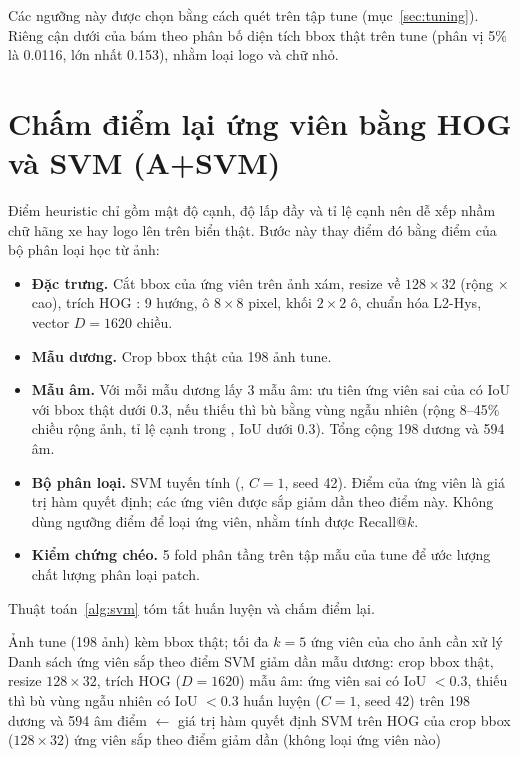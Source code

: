 Các ngưỡng này được chọn bằng cách quét trên tập tune (mục~\ref{sec:tuning}). Riêng cận dưới của  bám theo phân bố diện tích bbox thật trên tune (phân vị 5\% là 0.0116, lớn nhất 0.153), nhằm loại logo và chữ nhỏ.

\section{Chấm điểm lại ứng viên bằng HOG và SVM (A+SVM)}
\label{sec:hogsvm}

Điểm heuristic chỉ gồm mật độ cạnh, độ lấp đầy và tỉ lệ cạnh nên dễ xếp nhầm chữ hãng xe hay logo lên trên biển thật. Bước này thay điểm đó bằng điểm của bộ phân loại học từ ảnh:
\begin{itemize}
  \item \textbf{Đặc trưng.} Cắt bbox của ứng viên trên ảnh xám, resize về $128\times 32$ (rộng $\times$ cao), trích HOG \cite{hog}: 9 hướng, ô $8\times 8$ pixel, khối $2\times 2$ ô, chuẩn hóa L2-Hys, vector $D=1620$ chiều.
  \item \textbf{Mẫu dương.} Crop bbox thật của 198 ảnh tune.
  \item \textbf{Mẫu âm.} Với mỗi mẫu dương lấy 3 mẫu âm: ưu tiên ứng viên sai của  có IoU với bbox thật dưới 0.3, nếu thiếu thì bù bằng vùng ngẫu nhiên (rộng 8--45\% chiều rộng ảnh, tỉ lệ cạnh trong , IoU dưới 0.3). Tổng cộng 198 dương và 594 âm.
  \item \textbf{Bộ phân loại.} SVM tuyến tính \cite{svm} (, $C=1$, seed 42). Điểm của ứng viên là giá trị hàm quyết định; các ứng viên được sắp giảm dần theo điểm này. Không dùng ngưỡng điểm để loại ứng viên, nhằm tính được Recall@$k$.
  \item \textbf{Kiểm chứng chéo.} 5 fold phân tầng trên tập mẫu của tune để ước lượng chất lượng phân loại patch.
\end{itemize}
Thuật toán~\ref{alg:svm} tóm tắt huấn luyện và chấm điểm lại.

\begin{algorithm}[htbp]
\caption{Huấn luyện SVM và xếp lại ứng viên (A+SVM)}
\label{alg:svm}
\begin{algorithmic}[1]
\Require Ảnh tune (198 ảnh) kèm bbox thật; tối đa $k=5$ ứng viên của  cho ảnh cần xử lý
\Ensure Danh sách ứng viên sắp theo điểm SVM giảm dần
        \State mẫu dương: crop bbox thật, resize $128\times 32$, trích HOG ($D=1620$)
         mẫu âm: ứng viên sai có IoU $<0.3$, thiếu thì bù vùng ngẫu nhiên có IoU $<0.3$
    \EndFor
    \State huấn luyện  ($C=1$, seed 42) trên 198 dương và 594 âm
\EndProcedure
{}
        \State điểm $\gets$ giá trị hàm quyết định SVM trên HOG của crop bbox ($128\times 32$)
    \EndFor
    \State \Return ứng viên sắp theo điểm giảm dần (không loại ứng viên nào)
\EndProcedure
\end{algorithmic}
\end{algorithm}

